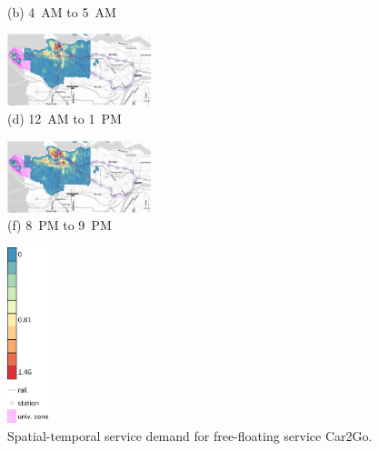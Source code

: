 \begin{figure}[hhh!!]
\begin{minipage}[b]{0.3\linewidth}
\begin{minipage}[b]{\linewidth}
           {\\(b) 4~AM to 5~AM}
         \end{minipage}
         \begin{minipage}[b]{\linewidth}
           \centering
           \hspace*{-0.1cm}
           \includegraphics[width=42mm]{car2go_heatmaps/min/12.pdf}
           {\\(d) 12~AM to 1~PM}
         \end{minipage}
         \begin{minipage}[b]{\linewidth}
           \hspace*{-0.1cm}
           \centering
           \includegraphics[width=42mm]{car2go_heatmaps/min/20.pdf}
           {\\(f) 8~PM to 9~PM}
         \end{minipage}
   \end{minipage}
   \begin{minipage}[b]{0.1\linewidth}
   \centering
   		 \hspace*{12mm}
   		 \includegraphics[width=12mm]{car2go_heatmaps/legenda_car2go.pdf}
         \vspace{17mm}
   \end{minipage}
   \caption{Spatial-temporal service demand for free-floating service Car2Go.}
   \label{fig:4_4_heat_car2go}
\end{figure}

